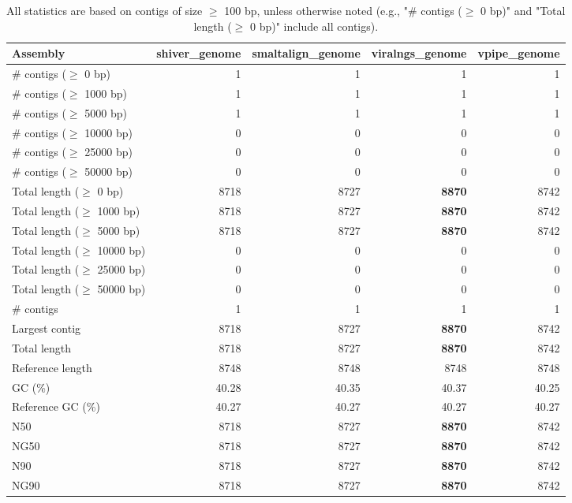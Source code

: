 \documentclass[12pt,a4paper]{article}
\begin{document}
\begin{table}[ht]
\begin{center}
\caption{All statistics are based on contigs of size $\geq$ 100 bp, unless otherwise noted (e.g., "\# contigs ($\geq$ 0 bp)" and "Total length ($\geq$ 0 bp)" include all contigs).}
\begin{tabular}{|l*{4}{|r}|}
\hline
Assembly & shiver\_genome & smaltalign\_genome & viralngs\_genome & vpipe\_genome \\ \hline
\# contigs ($\geq$ 0 bp) & 1 & 1 & 1 & 1 \\ \hline
\# contigs ($\geq$ 1000 bp) & 1 & 1 & 1 & 1 \\ \hline
\# contigs ($\geq$ 5000 bp) & 1 & 1 & 1 & 1 \\ \hline
\# contigs ($\geq$ 10000 bp) & 0 & 0 & 0 & 0 \\ \hline
\# contigs ($\geq$ 25000 bp) & 0 & 0 & 0 & 0 \\ \hline
\# contigs ($\geq$ 50000 bp) & 0 & 0 & 0 & 0 \\ \hline
Total length ($\geq$ 0 bp) & 8718 & 8727 & {\bf 8870} & 8742 \\ \hline
Total length ($\geq$ 1000 bp) & 8718 & 8727 & {\bf 8870} & 8742 \\ \hline
Total length ($\geq$ 5000 bp) & 8718 & 8727 & {\bf 8870} & 8742 \\ \hline
Total length ($\geq$ 10000 bp) & 0 & 0 & 0 & 0 \\ \hline
Total length ($\geq$ 25000 bp) & 0 & 0 & 0 & 0 \\ \hline
Total length ($\geq$ 50000 bp) & 0 & 0 & 0 & 0 \\ \hline
\# contigs & 1 & 1 & 1 & 1 \\ \hline
Largest contig & 8718 & 8727 & {\bf 8870} & 8742 \\ \hline
Total length & 8718 & 8727 & {\bf 8870} & 8742 \\ \hline
Reference length & 8748 & 8748 & 8748 & 8748 \\ \hline
GC (\%) & 40.28 & 40.35 & 40.37 & 40.25 \\ \hline
Reference GC (\%) & 40.27 & 40.27 & 40.27 & 40.27 \\ \hline
N50 & 8718 & 8727 & {\bf 8870} & 8742 \\ \hline
NG50 & 8718 & 8727 & {\bf 8870} & 8742 \\ \hline
N90 & 8718 & 8727 & {\bf 8870} & 8742 \\ \hline
NG90 & 8718 & 8727 & {\bf 8870} & 8742 \\ \hline

\end{tabular}
\end{center}
\end{table}
\end{document}
